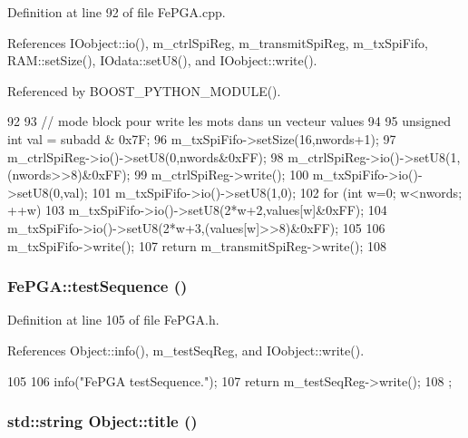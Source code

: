 Definition at line 92 of file FePGA.cpp.

References IOobject::io(), m\_\-ctrlSpiReg, m\_\-transmitSpiReg, m\_\-txSpiFifo, RAM::setSize(), IOdata::setU8(), and IOobject::write().

Referenced by BOOST\_\-PYTHON\_\-MODULE().


\begin{DoxyCode}
92                                                                                  
             {
93   // mode block pour write les mots dans un vecteur values
94 
95   unsigned int val = subadd & 0x7F; 
96   m_txSpiFifo->setSize(16,nwords+1);
97   m_ctrlSpiReg->io()->setU8(0,nwords&0xFF);
98   m_ctrlSpiReg->io()->setU8(1,(nwords>>8)&0xFF);
99   m_ctrlSpiReg->write();
100   m_txSpiFifo->io()->setU8(0,val);
101   m_txSpiFifo->io()->setU8(1,0);
102   for (int w=0; w<nwords; ++w) {
103     m_txSpiFifo->io()->setU8(2*w+2,values[w]&0xFF);
104     m_txSpiFifo->io()->setU8(2*w+3,(values[w]>>8)&0xFF);
105   }
106   m_txSpiFifo->write();
107   return m_transmitSpiReg->write();
108 }
\end{DoxyCode}
\hypertarget{classFePGA_a3d5a3231a960cd451bb37bb9120422e9}{
\subsubsection[{testSequence}]{ FePGA::testSequence ()}}
\label{classFePGA_a3d5a3231a960cd451bb37bb9120422e9}


Definition at line 105 of file FePGA.h.

References Object::info(), m\_\-testSeqReg, and IOobject::write().


\begin{DoxyCode}
105                             {
106     info("FePGA testSequence.");
107     return m_testSeqReg->write();
108   };
\end{DoxyCode}
\hypertarget{classObject_a73a0f1a41828fdd8303dd662446fb6c3}{
\subsubsection[{title}]{\setlength{\rightskip}{0pt plus 5cm}std::string Object::title ()}}
\label{classObject_a73a0f1a41828fdd8303dd662446fb6c3}


